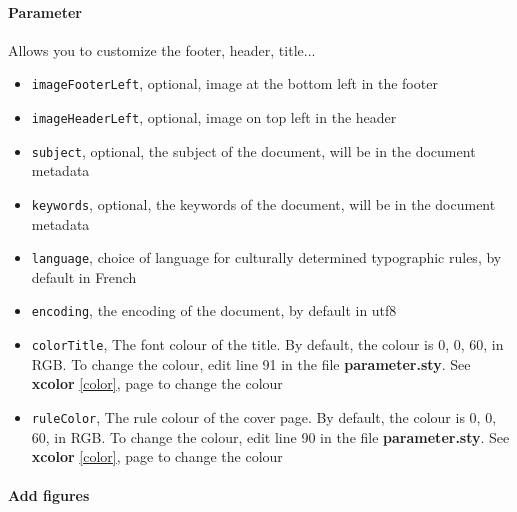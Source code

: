 \paragraph{Parameter}
Allows you to customize the footer, header, title...
\begin{itemize}
    \item \texttt{imageFooterLeft}, optional, image at the bottom left in the footer
    \item \texttt{imageHeaderLeft}, optional, image on top left in the header
    \item \texttt{subject}, optional, the subject of the document, will be in the
          document metadata
    \item \texttt{keywords}, optional, the keywords of the document, will be in the
          document metadata
    \item \texttt{language}, choice of language for culturally determined typographic
          rules, by default in French \label{language}
    \item \texttt{encoding}, the encoding of the document, by default in utf8
    \item \texttt{colorTitle}, The font colour of the title. By default, the colour is
          0, 0, 60, in RGB. To change the colour, edit line 91 in the file \textbf{parameter.sty}.
          See \textbf{xcolor} \ref{color}, page \pageref{color} to change the colour
    \item \texttt{ruleColor}, The rule colour of the cover page. By default, the colour is
          0, 0, 60, in RGB. To change the colour, edit line 90 in the file \textbf{parameter.sty}.
          See \textbf{xcolor} \ref{color}, page \pageref{color} to change the colour
\end{itemize}

\paragraph{Add figures}

